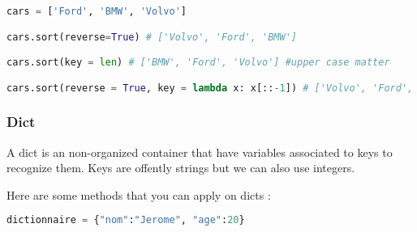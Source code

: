 \documentclass[a4paper, 12pt, titlepage]{scrartcl} %
\begin{document}
\begin{itemize}
\begin{lstlisting}[language=Python]
cars = ['Ford', 'BMW', 'Volvo']

cars.sort(reverse=True) # ['Volvo', 'Ford', 'BMW']

cars.sort(key = len) # ['BMW', 'Ford', 'Volvo'] #upper case matter

cars.sort(reverse = True, key = lambda x: x[::-1]) # ['Volvo', 'Ford', 'BMW']
\end{lstlisting} \vspace{5mm}
\end{itemize}

\subsubsection{Dict}
A dict is an non-organized container that have variables associated to keys to recognize them. Keys are offently strings but we can also use integers.

\vspace{5mm}

Here are some methods that you can apply on dicts : 
\begin{lstlisting}[language=Python]
dictionnaire = {"nom":"Jerome", "age":20}
\end{lstlisting} \vspace{5mm}
\end{document}
